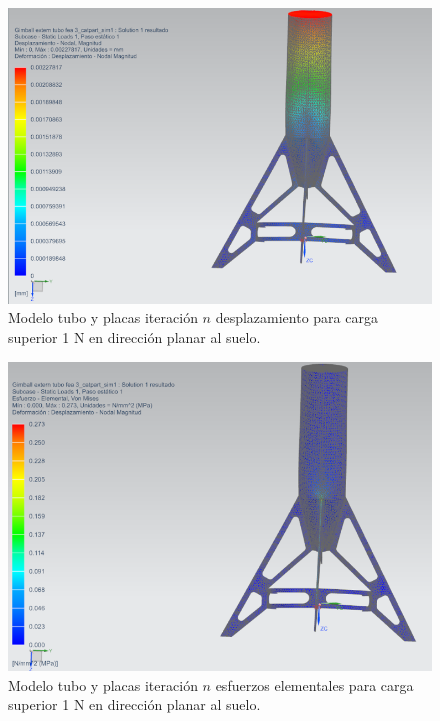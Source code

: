 \begin{figure}[htb]
    \centering
    \includegraphics[width=\linewidth]{fig/fea/patas1.png}
    \caption{Modelo tubo y placas iteración $n$ desplazamiento para carga superior 1 N en dirección planar al suelo.}
    \label{fig:fea/patas1}
\end{figure}

\begin{figure}[htb]
    \centering
    \includegraphics[width=\linewidth]{fig/fea/patas2.png}
    \caption{Modelo tubo y placas iteración $n$ esfuerzos elementales para carga superior 1 N en dirección planar al suelo.}
    \label{fig:fea/patas2}
\end{figure}

